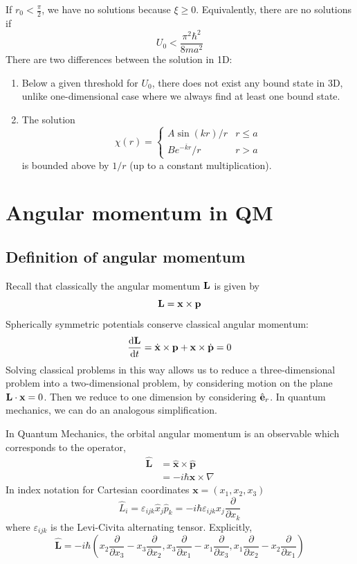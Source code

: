 \documentclass[a4paper,11pt]{article}
\begin{document}
If \( r_0 < \frac{\pi}{2} \), we have no solutions because \( \xi \geq 0 \).
Equivalently, there are no solutions if
\[
	U_0 < \frac{\pi^2 \hbar^2}{8ma^2}
\]
There are two differences between the solution in 1D: 
\begin{enumerate}
	\item Below a given threshold for $U_0$, there does not exist any bound state in 3D, unlike one-dimensional case where we always ﬁnd at least one bound state. 
	\item The solution 
	\[
		\chi(r) = \begin{cases}
			A \sin(kr)/r           & r \leq a \\
			B e^{-\overline k r}/r & r > a
		\end{cases}
	\]
	is bounded above by $ 1/r $ (up to a constant multiplication). 
\end{enumerate}

\section{Angular momentum in QM}
\subsection{Definition of angular momentum}
Recall that classically the angular momentum \( {\bf L} \) is given by
\[
	{\bf L} = {\bf x} \times {\bf p}
\]
Spherically symmetric potentials conserve classical angular momentum:
\[
	\dv{{\bf L}}{t} = \dot {{\bf x}} \times {\bf p} + {\bf x} \times \dot {{\bf p}} = 0
\]
Solving classical problems in this way allows us to reduce a three-dimensional problem into a two-dimensional problem, by considering motion on the plane \( {\bf L} \cdot {\bf x} = 0 \).
Then we reduce to one dimension by considering \( \hat {{\bf e}}_r \).
In quantum mechanics, we can do an analogous simplification.

\begin{definition}
	In Quantum Mechanics, the orbital angular momentum is an observable which corresponds to the operator,
	\[
	\begin{aligned}
	\hat{\mathbf{L}} &=\hat{\mathbf{x}} \times \hat{\mathbf{p}} \\
	&=-i \hbar \mathbf{x} \times \nabla
	\end{aligned}
	\]
	In index notation for Cartesian coordinates $\mathbf{x}=\left(x_1, x_2, x_3\right)$
	\[
	\hat{L}_i=\varepsilon_{i j k} \hat{x}_j \hat{p}_k=-i \hbar \varepsilon_{i j k} x_j \frac{\partial}{\partial x_k}
	\]
	where $\varepsilon_{i j k}$ is the Levi-Civita alternating tensor. Explicitly,
	\[
	\hat{\mathbf{L}}=-i \hbar\left(x_2 \frac{\partial}{\partial x_3}-x_3 \frac{\partial}{\partial x_2}, x_3 \frac{\partial}{\partial x_1}-x_1 \frac{\partial}{\partial x_3}, x_1 \frac{\partial}{\partial x_2}-x_2 \frac{\partial}{\partial x_1}\right)
	\]
\end{definition}
\end{document}

